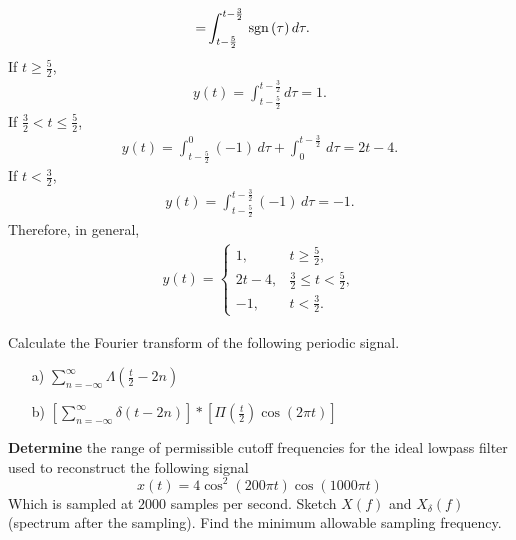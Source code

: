 \documentclass{assignment}
\begin{document}
\begin{sol}
\begin{itemize}
\begin{align}
            =&\int_{t-\frac{5}{2}}^{t-\frac{3}{2}}\,\text{sgn}\,(\tau)\,d\tau.
        \end{align}
        If $t\geq\frac{5}{2}$,
        \begin{align}
            y(t)=\int_{t-\frac{5}{2}}^{t-\frac{3}{2}}d\tau=1.
        \end{align}
        If $\frac{3}{2}<t\leq\frac{5}{2}$,
        \begin{align}
            y(t)=\int_{t-\frac{5}{2}}^0(-1)\,d\tau+\int_0^{t-\frac{3}{2}}\,d\tau=2t-4.
        \end{align}
        If $t<\frac{3}{2}$,
        \begin{align}
            y(t)=\int_{t-\frac{5}{2}}^{t-\frac{3}{2}}(-1)\,d\tau=-1.
        \end{align}
        Therefore, in general,
        \begin{align}
            y(t)=\left\{\begin{array}{ll}
                1,&t\geq\frac{5}{2},\\
                2t-4,&\frac{3}{2}\leq t<\frac{5}{2},\\
                -1,&t<\frac{3}{2}.
            \end{array}\right.
        \end{align}
    \end{itemize}
\end{sol}

\begin{prob}[20 pts]
    Calculate the Fourier transform of the following periodic signal.
    \begin{itemize}
        \item[a)] $\sum_{n=-\infty}^{\infty}\Lambda(\frac{t}{2}-2n)$
        \item[b)] $\left[\sum_{n=-\infty}^{\infty}\delta(t-2n)\right]*\left[\Pi(\frac{t}{2})\cos(2\pi t)\right]$
    \end{itemize}
\end{prob}
\begin{sol}

\end{sol}

\begin{prob}[15 pts]
    \textbf{Determine} the range of permissible cutoff frequencies for the ideal lowpass filter used to reconstruct the following signal
    \[
        x(t)=4\cos^2(200\pi t)\cos(1000\pi t)
    \]
    Which is sampled at $2000$ samples per second. Sketch $X(f)$ and $X_{\delta}(f)$ (spectrum after the sampling). Find the minimum allowable sampling frequency.
\end{prob}
\begin{sol}

\end{sol}
\end{document}
